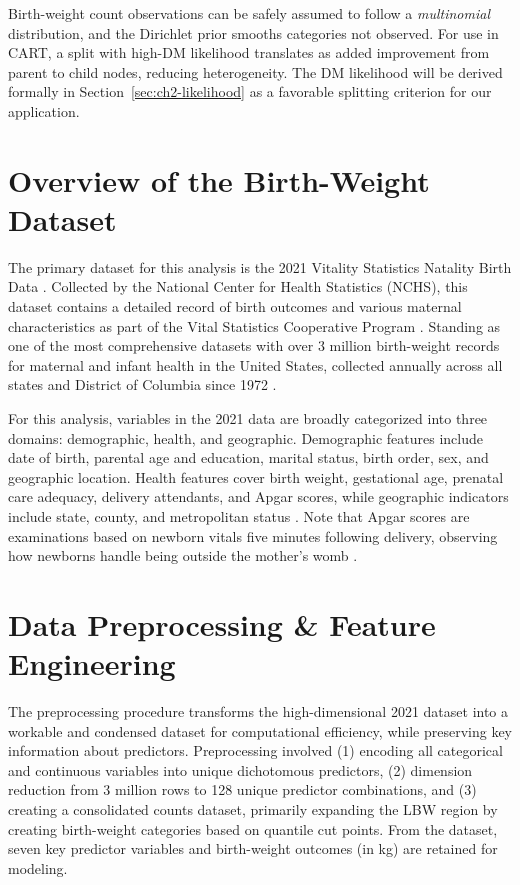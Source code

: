 Birth-weight count observations can be safely assumed to follow a \emph{multinomial} distribution, and the Dirichlet prior smooths categories not observed. For use in CART, a split with high-DM likelihood translates as added improvement from parent to child nodes, reducing heterogeneity. The DM likelihood will be derived formally in Section~\ref{sec:ch2-likelihood} as a favorable splitting criterion for our application. 

\section{Overview of the Birth-Weight Dataset}
\label{sec:ch2-introduction}

The primary dataset for this analysis is the 2021 Vitality Statistics Natality Birth Data \citep{nber_birth_data}. Collected by the National Center for Health Statistics (NCHS), this dataset contains a detailed record of birth outcomes and various maternal characteristics as part of the Vital Statistics Cooperative Program \citep{jain2024, nber_birth_data}. Standing as one of the most comprehensive datasets with over 3 million birth-weight records for maternal and infant health in the United States, collected annually across all states and District of Columbia since 1972 \citep{nber_birth_data}.

For this analysis, variables in the 2021 data are broadly categorized into three domains: demographic, health, and geographic. Demographic features include date of birth, parental age and education, marital status, birth order, sex, and geographic location. Health features cover birth weight, gestational age, prenatal care adequacy, delivery attendants, and Apgar scores, while geographic indicators include state, county, and metropolitan  status \citep{nber_birth_data}. Note that Apgar scores are examinations based on newborn vitals five minutes following delivery, observing how newborns handle being outside the mother's womb \citep{apgar_score}.

\section{Data Preprocessing \& Feature Engineering}
\label{sec:ch2-preprocessing}

The preprocessing procedure transforms the high-dimensional 2021 dataset into a workable and condensed dataset for computational efficiency, while preserving key information about predictors. Preprocessing involved (1) encoding all categorical and continuous variables into unique dichotomous predictors, (2) dimension reduction from 3 million rows to 128 unique predictor combinations, and (3) creating a consolidated counts dataset, primarily expanding the LBW region by creating birth-weight categories based on quantile cut points. From the dataset, seven key predictor variables and birth-weight outcomes (in kg) are retained for modeling. 

